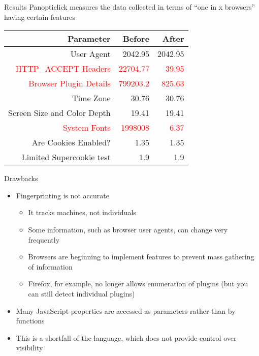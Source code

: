 \begin{frame}[fragile,t]{Results}
	Panopticlick measures the data collected in terms of ``one in x browsers'' having certain features
	
	\begin{table}[h]
	\centering
	\begin{tabular}{>{\scriptsize}r|>{\scriptsize}r|>{\scriptsize}r}
		\textbf{Parameter} & \textbf{Before} & \textbf{After} \\
		\hline
		User Agent & 2042.95 & 2042.95 \\
		\textcolor{red}{HTTP\_ACCEPT Headers} & \textcolor{red}{22704.77} & \textcolor{red}{39.95} \\
		\textcolor{red}{Browser Plugin Details} & \textcolor{red}{799203.2} & \textcolor{red}{825.63} \\
		Time Zone & 30.76 & 30.76 \\
		Screen Size and Color Depth & 19.41 & 19.41 \\
		\textcolor{red}{System Fonts} & \textcolor{red}{1998008} & \textcolor{red}{6.37} \\
		Are Cookies Enabled? & 1.35 & 1.35 \\
		Limited Supercookie test & 1.9 & 1.9
	\end{tabular}
	\end{table}
\end{frame}

\begin{frame}[fragile,t]{Drawbacks}
	\begin{itemize}
		\item Fingerprinting is not accurate
		\begin{itemize}
			\item It tracks machines, not individuals
			\item Some information, such as browser user agents, can change very frequently
			\item Browsers are beginning to implement features to prevent mass gathering of information
			\item Firefox, for example, no longer allows enumeration of plugins (but you can still detect individual plugins)
		\end{itemize}
		\item Many JavaScript properties are accessed as parameters rather than by functions
		\item This is a shortfall of the language, which does not provide control over visibility
	\end{itemize}
\end{frame}

